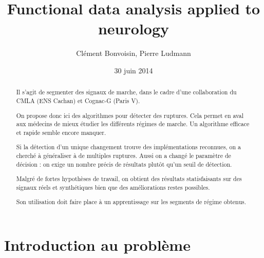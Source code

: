 \documentclass[french,12pt,notitlepage]{report}
\begin{document}
	\title{Functional data analysis applied to neurology}
	\author{Clément Bonvoisin, Pierre Ludmann}
	\date{30 juin 2014}
	\maketitle

	\begin{abstract}
  
Il s'agit de segmenter des signaux de marche,
dans le cadre d'une collaboration du CMLA (ENS Cachan) et Cognac-G (Paris V).

On propose donc ici des algorithmes pour détecter des ruptures.
Cela permet en aval aux médecins de mieux étudier les différents régimes de marche.
Un algorithme efficace et rapide semble encore manquer.

Si la détection d'un unique changement trouve des implémentations reconnues,
on a cherché à généraliser à de multiples ruptures.
Aussi on a changé le paramètre de décision : on exige un nombre précis de résultats plutôt qu'un seuil de détection.

Malgré de fortes hypothèses de travail,
on obtient des résultats statisfaisants sur des signaux réels et synthétiques
bien que des améliorations restes possibles.

Son utilisation doit faire place à un apprentissage sur les segments de régime obtenus.
	
	\end{abstract}

	\tableofcontents

	\chapter{Introduction au problème}
\end{document}
